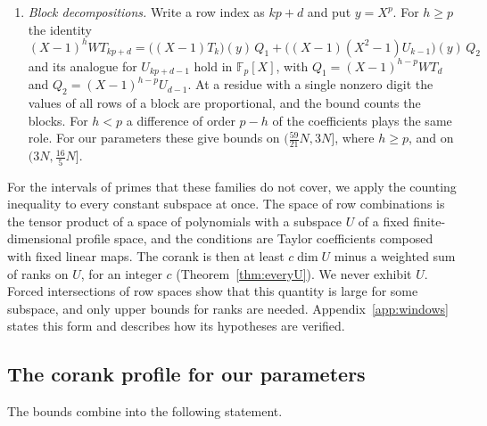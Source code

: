 \documentclass[11pt]{amsart}
\theoremstyle{definition}
\theoremstyle{remark}
\numberwithin{equation}{section}
\newcommand{\F}{\mathbb F}
\begin{document}
\begin{enumerate}[label=(F\arabic*),wide]
exists for every $p$ prime to a fixed integer, and the bound is the dimension of the solution space minus
the number of conditions. In two of these families the entries depend only on the residue of the column
modulo $p$, so the difference of order $q$ imposes $(p-q)_+$ conditions. When $h\ge p$ one writes
$(X-1)^h=(X^p-1)(X-1)^{h-p}$, which imposes $h-p$ more conditions. These families give the bounds on
$(\frac{58}{17}N,\frac{59}{17}N]$, $(\frac{29}8N,\frac{11}3N]$, $(\frac{16}7N,\frac52N]$ and on six intervals in
$(\frac{341}{25}N,\frac{809}{50}N]$.
\item \emph{Block decompositions.} Write a row index as $kp+d$ and put $y=X^p$. For $h\ge p$ the identity
\[
 (X-1)^hWT_{kp+d}=\bigl((X-1)T_k\bigr)(y)\,Q_1+\bigl((X-1)(X^2-1)U_{k-1}\bigr)(y)\,Q_2
\]
and its analogue for $U_{kp+d-1}$ hold in $\F_p[X]$, with $Q_1=(X-1)^{h-p}WT_d$ and $Q_2=(X-1)^{h-p}U_{d-1}$.
At a residue with a single nonzero digit the values of all rows of a block are proportional, and the bound
counts the blocks. For $h<p$ a difference of order $p-h$ of the coefficients plays the same role. For our
parameters these give bounds on $(\frac{59}{21}N,3N]$, where $h\ge p$, and on $(3N,\frac{16}5N]$.
\end{enumerate}

For the intervals of primes that these families do not cover, we apply the counting inequality to every
constant subspace at once. The space of row combinations is the tensor product of a space of polynomials
with a subspace $U$ of a fixed finite-dimensional profile space, and the conditions are Taylor coefficients
composed with fixed linear maps. The corank is then at least $c\dim U$ minus a weighted sum of ranks on $U$, for an integer $c$ (Theorem~\ref{thm:everyU}). We never exhibit $U$. Forced intersections of row spaces show that this quantity is large for some subspace, and only upper bounds for ranks are needed. Appendix~\ref{app:windows} states this form and describes how its
hypotheses are verified.

\subsection{The corank profile for our parameters}\label{ssec:kappa}
The bounds combine into the following statement.
\end{document}
